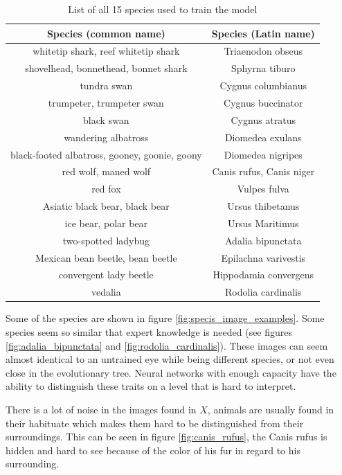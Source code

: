\documentclass[times, utf8, diplomski]{fer}
\begin{document}
\begin{table}
\centering
\caption{List of all 15 species used to train the model}
\label{tb:species_list}
\begin{tabular}{cc}
\hline 
Species (common name) & Species (Latin name)\\ \hline 
whitetip shark, reef whitetip shark & Triaenodon obseus \\
shovelhead, bonnethead, bonnet shark & Sphyrna tiburo \\
tundra swan & Cygnus columbianus \\
trumpeter, trumpeter swan & Cygnus buccinator \\
black swan & Cygnus atratus \\
wandering albatross & Diomedea exulans \\
black-footed albatross, gooney, goonie, goony & Diomedea nigripes \\
red wolf, maned wolf & Canis rufus, Canis niger \\
red fox & Vulpes fulva \\
Asiatic black bear, black bear & Ursus thibetanus\\
ice bear, polar bear & Ursus Maritimus \\
two-spotted ladybug & Adalia bipunctata \\
Mexican bean beetle, bean beetle & Epilachna varivestis \\
convergent lady beetle & Hippodamia convergens \\
vedalia & Rodolia cardinalis \\
\hline 
\end{tabular} 
\end{table}

Some of the species are shown in figure \ref{fig:specis_image_examples}. Some species seem so similar that expert knowledge is needed (see figures \ref{fig:adalia_bipunctata} and \ref{fig:rodolia_cardinalis}). These images can seem almost identical to an untrained eye while being different species, or not even close in the evolutionary tree. Neural networks with enough capacity have the ability to distinguish these traits on a level that is hard to interpret.

There is a lot of noise in the images found in $X$, animals are usually found in their habituate which makes them hard to be distinguished from their surroundings. This can be seen in figure \ref{fig:canis_rufus}, the Canis rufus is hidden and hard to see because of the color of his fur in regard to his surrounding.
\end{document}
